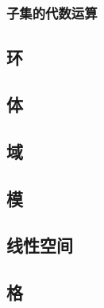 \subsubsection{子集的代数运算}
\begin{definition}[子集和元素间的代数运算]\label{子集的代数运算}
    
\end{definition}
\begin{theorem}[陪集划分是一种等价划分]\label{陪集划分定理}
    
\end{theorem}
\subsection{环}
\subsection{体}
\subsection{域}
\subsection{模}
\subsection{线性空间}
\subsection{格}





























